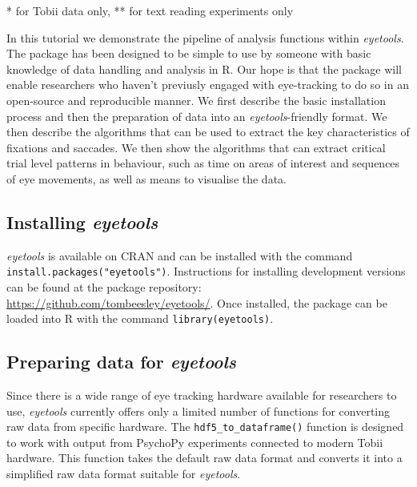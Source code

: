 \documentclass[
  man,
  floatsintext,
  longtable,
  nolmodern,
  notxfonts,
  notimes,
  colorlinks=true,linkcolor=blue,citecolor=blue,urlcolor=blue]{apa7}
\begin{document}
* for Tobii data only, ** for text reading experiments only

In this tutorial we demonstrate the pipeline of analysis functions
within \emph{eyetools}. The package has been designed to be simple to
use by someone with basic knowledge of data handling and analysis in R.
Our hope is that the package will enable researchers who haven't
previusly engaged with eye-tracking to do so in an open-source and
reproducible manner. We first describe the basic installation process
and then the preparation of data into an \emph{eyetools}-friendly
format. We then describe the algorithms that can be used to extract the
key characteristics of fixations and saccades. We then show the
algorithms that can extract critical trial level patterns in behaviour,
such as time on areas of interest and sequences of eye movements, as
well as means to visualise the data.

\subsection{\texorpdfstring{Installing
\emph{eyetools}}{Installing eyetools}}\label{installing-eyetools}

\emph{eyetools} is available on CRAN and can be installed with the
command \texttt{install.packages("eyetools")}. Instructions for
installing development versions can be found at the package repository:
\url{https://github.com/tombeesley/eyetools/}. Once installed, the
package can be loaded into R with the command
\texttt{library(eyetools)}.

\subsection{\texorpdfstring{Preparing data for
\emph{eyetools}}{Preparing data for eyetools}}\label{preparing-data-for-eyetools}

Since there is a wide range of eye tracking hardware available for
researchers to use, \emph{eyetools} currently offers only a limited
number of functions for converting raw data from specific hardware. The
\texttt{hdf5\_to\_dataframe()} function is designed to work with output
from PsychoPy experiments connected to modern Tobii hardware. This
function takes the default raw data format and converts it into a
simplified raw data format suitable for \emph{eyetools}.
\end{document}
